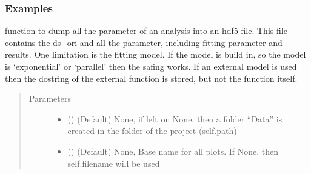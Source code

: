 \documentclass[letterpaper,10pt,english]{sphinxmanual}
\begin{document}
\begin{fulllineitems}
\begin{fulllineitems}
\begin{quote}
\begin{description}
\begin{itemize}
\end{itemize}

\end{description}\end{quote}
\subsubsection*{Examples}

\begin{sphinxVerbatim}[commandchars=\\\{\}]
\end{sphinxVerbatim}

\end{fulllineitems}


\begin{fulllineitems}
\label{\detokenize{plot_func:plot_func.TA.Save_project}}
function to dump all the parameter of an analysis into an hdf5 file.
This file contains the ds\_ori and all the parameter, including fitting parameter
and results.
One limitation is the fitting model. If the model is build in, so the model is
‘exponential’ or ‘parallel’ then the safing works. If an external model is used then the
dostring of the external function is stored, but not the function itself.
\begin{quote}\begin{description}
\item[{Parameters}] \leavevmode\begin{itemize}
\item {} 
 (\sphinxstyleliteralemphasis{\sphinxupquote{, }}\sphinxstyleliteralemphasis{\sphinxupquote{, }}) \textendash{} (Default) None, if left on None, then a folder “Data” is created in the folder
of the project (self.path)

\item {} 
 (\sphinxstyleliteralemphasis{\sphinxupquote{, }}) \textendash{} (Default) None, Base name for all plots. If None, then self.filename will be used


\end{itemize}
\end{description}
\end{quote}
\end{fulllineitems}
\end{fulllineitems}
\end{document}
